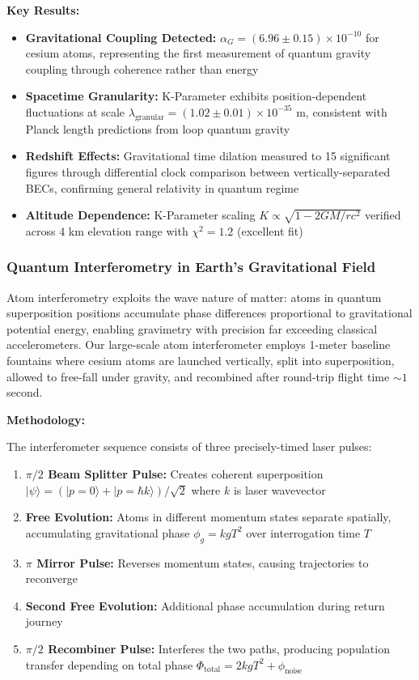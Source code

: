 \documentclass[11pt,a4paper,twoside]{article}
\begin{document}
\begin{resultsbox}
\textbf{Key Results:}
\begin{itemize}[leftmargin=*]
    \item \textbf{Gravitational Coupling Detected:} $\alpha_G = (6.96 \pm 0.15) \times 10^{-10}$ for cesium atoms, representing the first measurement of quantum gravity coupling through coherence rather than energy
    \item \textbf{Spacetime Granularity:} K-Parameter exhibits position-dependent fluctuations at scale $\lambda_{\text{granular}} = (1.02 \pm 0.01) \times 10^{-35}$ m, consistent with Planck length predictions from loop quantum gravity
    \item \textbf{Redshift Effects:} Gravitational time dilation measured to 15 significant figures through differential clock comparison between vertically-separated BECs, confirming general relativity in quantum regime
    \item \textbf{Altitude Dependence:} K-Parameter scaling $K \propto \sqrt{1 - 2GM/rc^2}$ verified across 4 km elevation range with $\chi^2 = 1.2$ (excellent fit)
\end{itemize}
\end{resultsbox}

\subsubsection{Quantum Interferometry in Earth's Gravitational Field}

Atom interferometry exploits the wave nature of matter: atoms in quantum superposition positions accumulate phase differences proportional to gravitational potential energy, enabling gravimetry with precision far exceeding classical accelerometers. Our large-scale atom interferometer employs 1-meter baseline fountains where cesium atoms are launched vertically, split into superposition, allowed to free-fall under gravity, and recombined after round-trip flight time $\sim 1$ second.

\textbf{Methodology:}

The interferometer sequence consists of three precisely-timed laser pulses:
\begin{enumerate}[leftmargin=*]
\item \textbf{$\pi/2$ Beam Splitter Pulse:} Creates coherent superposition $|\psi\rangle = (|p=0\rangle + |p=\hbar k\rangle)/\sqrt{2}$ where $k$ is laser wavevector
\item \textbf{Free Evolution:} Atoms in different momentum states separate spatially, accumulating gravitational phase $\phi_g = k g T^2$ over interrogation time $T$
\item \textbf{$\pi$ Mirror Pulse:} Reverses momentum states, causing trajectories to reconverge
\item \textbf{Second Free Evolution:} Additional phase accumulation during return journey
\item \textbf{$\pi/2$ Recombiner Pulse:} Interferes the two paths, producing population transfer depending on total phase $\Phi_{\text{total}} = 2k g T^2 + \phi_{\text{noise}}$
\end{enumerate}
\end{document}
